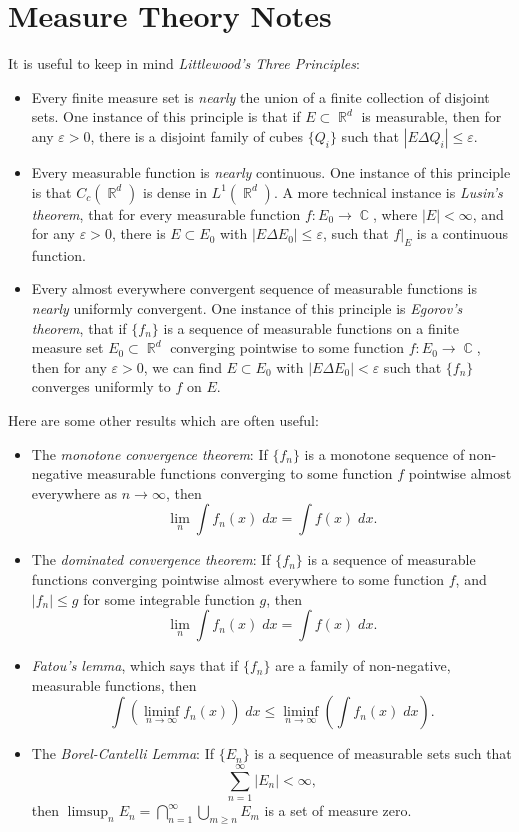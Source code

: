 \documentclass[answers]{exam}
\DeclareMathOperator{\CC}{\mathbb{C}}
\DeclareMathOperator{\RR}{\mathbb{R}}
\theoremstyle{problemstyle}
\newcommand{\1}[1]{\textbf{1}_{\left[#1\right]}} %
\begin{document}
\newpage
\section{Measure Theory Notes}

It is useful to keep in mind \emph{Littlewood's Three Principles}:
%
\begin{itemize}
	\item Every finite measure set is \emph{nearly} the union of a finite collection of disjoint sets. One instance of this principle is that if $E \subset \RR^d$ is measurable, then for any $\varepsilon > 0$, there is a disjoint family of cubes $\{ Q_i \}$ such that $|E \Delta Q_i| \leq \varepsilon$.

	\item Every measurable function is \emph{nearly} continuous. One instance of this principle is that $C_c(\RR^d)$ is dense in $L^1(\RR^d)$. A more technical instance is \emph{Lusin's theorem}, that for every measurable function $f: E_0 \to \CC$, where $|E| < \infty$, and for any $\varepsilon > 0$, there is $E \subset E_0$ with $|E \Delta E_0| \leq \varepsilon$, such that $f|_E$ is a continuous function.

	\item Every almost everywhere convergent sequence of measurable functions is \emph{nearly} uniformly convergent. One instance of this principle is \emph{Egorov's theorem}, that if $\{ f_n \}$ is a sequence of measurable functions on a finite measure set $E_0 \subset \RR^d$ converging pointwise to some function $f: E_0 \to \CC$, then for any $\varepsilon > 0$, we can find $E \subset E_0$ with $|E \Delta E_0| < \varepsilon$ such that $\{ f_n \}$ converges uniformly to $f$ on $E$.
\end{itemize}
%
Here are some other results which are often useful:
%
\begin{itemize}
	\item The \emph{monotone convergence theorem}: If $\{ f_n \}$ is a monotone sequence of non-negative measurable functions converging to some function $f$ pointwise almost everywhere as $n \to \infty$, then
	\[ \lim_n \int f_n(x)\; dx = \int f(x)\; dx. \]

	\item The \emph{dominated convergence theorem}: If $\{ f_n \}$ is a sequence of measurable functions converging pointwise almost everywhere to some function $f$, and $|f_n| \leq g$ for some integrable function $g$, then
	\[ \lim_n \int f_n(x)\; dx = \int f(x)\; dx. \]

	\item \emph{Fatou's lemma}, which says that if $\{ f_n \}$ are a family of non-negative, measurable functions, then
	\[ \int \left( \liminf_{n \to \infty} f_n(x) \right)\; dx \leq \liminf_{n \to \infty} \left( \int f_n(x)\; dx \right). \]

	\item The \emph{Borel-Cantelli Lemma}: If $\{ E_n \}$ is a sequence of measurable sets such that
	\[ \sum_{n = 1}^\infty |E_n| < \infty, \]
	then $\limsup_n E_n = \bigcap_{n = 1}^\infty \bigcup_{m \geq n} E_m$ is a set of measure zero.
\end{itemize}
\end{document}
